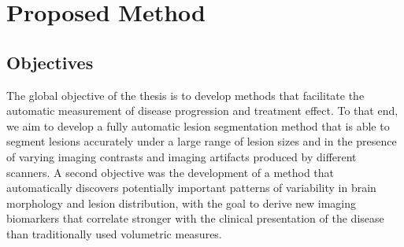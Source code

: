 % 

\section[Proposed method]{Proposed Method}

\subsection{Objectives}


The global objective of the thesis is to develop methods that facilitate the
automatic measurement of disease progression and treatment effect. To that end,
we aim to develop a fully automatic lesion segmentation method that is able
to segment lesions accurately under a large range of lesion sizes and in the
presence of varying imaging contrasts and imaging artifacts produced by
different scanners. A second objective was the development of a method that
automatically discovers potentially important patterns of variability in brain
morphology and lesion distribution, with the goal to derive new imaging
biomarkers that correlate stronger with the clinical presentation of the disease
than traditionally used volumetric measures.

